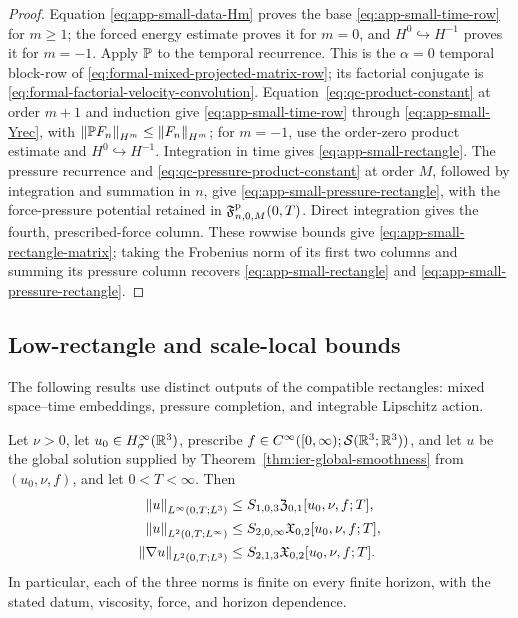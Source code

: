\begin{proof}
Equation \eqref{eq:app-small-data-Hm} proves the base
\eqref{eq:app-small-time-row} for \(m\ge1\); the forced energy estimate
proves it for \(m=0\), and \(H^0\hookrightarrow H^{-1}\) proves it for
\(m=-1\).  Apply \(\mathbb P\) to the temporal recurrence.
This is the \(\alpha=0\) temporal block-row of
\eqref{eq:formal-mixed-projected-matrix-row}; its factorial conjugate is
\eqref{eq:formal-factorial-velocity-convolution}.
Equation~\eqref{eq:qc-product-constant} at order \(m+1\) and induction give
\eqref{eq:app-small-time-row} through
\eqref{eq:app-small-Yrec}, with
\(\left\lVert \mathbb P F_n\right\rVert_{H^m}\le\left\lVert F_n\right\rVert_{H^m}\); for \(m=-1\), use the order-zero product
estimate and \(H^0\hookrightarrow H^{-1}\).  Integration in time gives
\eqref{eq:app-small-rectangle}.  The pressure recurrence and
\eqref{eq:qc-pressure-product-constant} at order \(M\), followed by
integration and summation in \(n\), give
\eqref{eq:app-small-pressure-rectangle}, with the force-pressure potential
retained in \(\mathfrak F^{\rm p}_{n,0,M}(0,T)\).  Direct integration gives
the fourth, prescribed-force column.  These rowwise bounds give
\eqref{eq:app-small-rectangle-matrix}; taking the Frobenius norm of its first
two columns and summing its pressure column recovers
\eqref{eq:app-small-rectangle} and
\eqref{eq:app-small-pressure-rectangle}.
\end{proof}

\subsection{Low-rectangle and scale-local bounds}

The following results use distinct outputs of the compatible rectangles:
mixed space--time embeddings, pressure completion, and integrable Lipschitz
action.

\begin{proposition}
\label{prop:app-low-rectangle-classes}
Let \(\nu>0\), let \(u_0\in H^\infty_\sigma(\mathbb R^3)\), prescribe
\(f\in C^\infty([0,\infty);\mathcal S(\mathbb R^3;\mathbb R^3))\), and let \(u\) be the
global solution supplied by
Theorem~\ref{thm:ier-global-smoothness} from \((u_0,\nu,f)\), and let
\(0<T<\infty\).  Then
\begin{align}
 \left\lVert u\right\rVert_{L^\infty(0,T;L^3)}
 &\le S_{1,0,3}\mathfrak Z_{0,1}[u_0,\nu,f;T],
 \label{eq:app-LinfL3}\\
 \left\lVert u\right\rVert_{L^2(0,T;L^\infty)}
 &\le S_{2,0,\infty}\mathfrak X_{0,2}[u_0,\nu,f;T],
 \label{eq:app-L2Linfty}\\
 \left\lVert \nabla u\right\rVert_{L^2(0,T;L^3)}
 &\le S_{2,1,3}\mathfrak X_{0,2}[u_0,\nu,f;T].
 \label{eq:app-grad-L2L3}
\end{align}
In particular, each of the three norms is finite on every finite horizon,
with the stated datum, viscosity, force, and horizon dependence.
\end{proposition}

